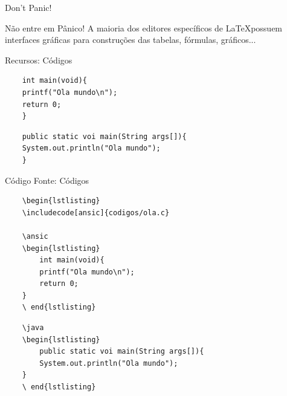 \begin{frame}{Don't Panic!}
    \begin{alertblock}{Não entre em Pânico!}
        A maioria dos editores específicos de \LaTeX possuem interfaces gráficas para construções das tabelas, fórmulas, gráficos...\\
    \end{alertblock}
\end{frame}


%



\begin{frame}[fragile]{Recursos: Códigos}
    
    
    \ansic
    \begin{lstlisting}
    int main(void){
    printf("Ola mundo\n");
    return 0;
    }
    \end{lstlisting}
    \java
    
    \begin{lstlisting}
    public static voi main(String args[]){
    System.out.println("Ola mundo");
    }
    \end{lstlisting}	
    
\end{frame} 
\begin{frame}[fragile]{Código Fonte: Códigos}
    \begin{lstlisting}
    \begin{lstlisting}
    \includecode[ansic]{codigos/ola.c}	
    
    \ansic
    \begin{lstlisting}
        int main(void){
        printf("Ola mundo\n");
        return 0;
    }
    \ end{lstlisting}
    \end{lstlisting}

    \begin{lstlisting}
    \java
    \begin{lstlisting}
        public static voi main(String args[]){
        System.out.println("Ola mundo");
    }
    \ end{lstlisting}
    \end{lstlisting}
    
\end{frame} 